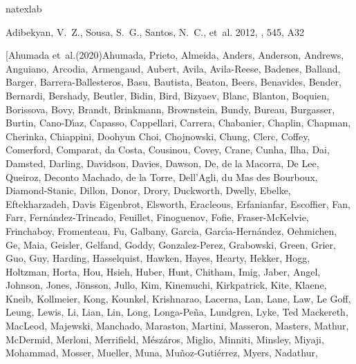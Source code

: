 \documentclass[onecolumn]{aa}
\begin{document}
\begin{thebibliography}{149}
	\expandafter\ifx\csname natexlab\endcsname\relax\def\natexlab#1{#1}\fi
	
	{Adibekyan}, V.~Z., {Sousa}, S.~G., {Santos}, N.~C., {et~al.} 2012, \aap, 545,
	A32
	
	\bibitem[{{Ahumada} {et~al.}(2020){Ahumada}, {Prieto}, {Almeida}, {Anders},
		{Anderson}, {Andrews}, {Anguiano}, {Arcodia}, {Armengaud}, {Aubert}, {Avila},
		{Avila-Reese}, {Badenes}, {Balland}, {Barger}, {Barrera-Ballesteros}, {Basu},
		{Bautista}, {Beaton}, {Beers}, {Benavides}, {Bender}, {Bernardi}, {Bershady},
		{Beutler}, {Bidin}, {Bird}, {Bizyaev}, {Blanc}, {Blanton}, {Boquien},
		{Borissova}, {Bovy}, {Brandt}, {Brinkmann}, {Brownstein}, {Bundy}, {Bureau},
		{Burgasser}, {Burtin}, {Cano-D{\'\i}az}, {Capasso}, {Cappellari}, {Carrera},
		{Chabanier}, {Chaplin}, {Chapman}, {Cherinka}, {Chiappini}, {Doohyun Choi},
		{Chojnowski}, {Chung}, {Clerc}, {Coffey}, {Comerford}, {Comparat}, {da
			Costa}, {Cousinou}, {Covey}, {Crane}, {Cunha}, {Ilha}, {Dai}, {Damsted},
		{Darling}, {Davidson}, {Davies}, {Dawson}, {De}, {de la Macorra}, {De Lee},
		{Queiroz}, {Deconto Machado}, {de la Torre}, {Dell'Agli}, {du Mas des
			Bourboux}, {Diamond-Stanic}, {Dillon}, {Donor}, {Drory}, {Duckworth},
		{Dwelly}, {Ebelke}, {Eftekharzadeh}, {Davis Eigenbrot}, {Elsworth},
		{Eracleous}, {Erfanianfar}, {Escoffier}, {Fan}, {Farr},
		{Fern{\'a}ndez-Trincado}, {Feuillet}, {Finoguenov}, {Fofie},
		{Fraser-McKelvie}, {Frinchaboy}, {Fromenteau}, {Fu}, {Galbany}, {Garcia},
		{Garc{\'\i}a-Hern{\'a}ndez}, {Oehmichen}, {Ge}, {Maia}, {Geisler}, {Gelfand},
		{Goddy}, {Gonzalez-Perez}, {Grabowski}, {Green}, {Grier}, {Guo}, {Guy},
		{Harding}, {Hasselquist}, {Hawken}, {Hayes}, {Hearty}, {Hekker}, {Hogg},
		{Holtzman}, {Horta}, {Hou}, {Hsieh}, {Huber}, {Hunt}, {Chitham}, {Imig},
		{Jaber}, {Angel}, {Johnson}, {Jones}, {J{\"o}nsson}, {Jullo}, {Kim},
		{Kinemuchi}, {Kirkpatrick}, {Kite}, {Klaene}, {Kneib}, {Kollmeier}, {Kong},
		{Kounkel}, {Krishnarao}, {Lacerna}, {Lan}, {Lane}, {Law}, {Le Goff}, {Leung},
		{Lewis}, {Li}, {Lian}, {Lin}, {Long}, {Longa-Pe{\~n}a}, {Lundgren}, {Lyke},
		{Ted Mackereth}, {MacLeod}, {Majewski}, {Manchado}, {Maraston}, {Martini},
		{Masseron}, {Masters}, {Mathur}, {McDermid}, {Merloni}, {Merrifield},
		{M{\'e}sz{\'a}ros}, {Miglio}, {Minniti}, {Minsley}, {Miyaji}, {Mohammad},
		{Mosser}, {Mueller}, {Muna}, {Mu{\~n}oz-Guti{\'e}rrez}, {Myers}, {Nadathur},
}
\end{thebibliography}
\end{document}
